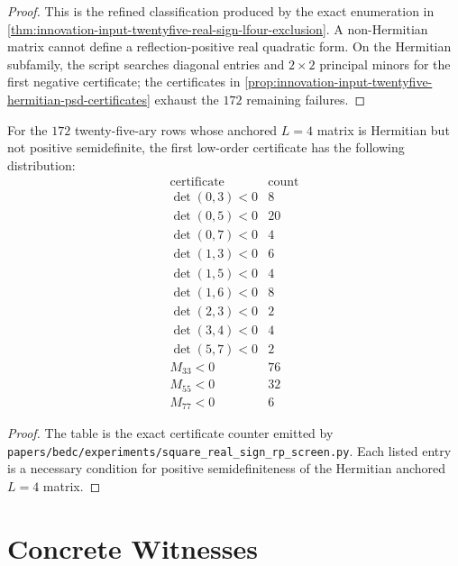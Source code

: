 \begin{proof}
This is the refined classification produced by the exact enumeration in
\autoref{thm:innovation-input-twentyfive-real-sign-lfour-exclusion}. A
non-Hermitian matrix cannot define a reflection-positive real quadratic
form. On the Hermitian subfamily, the script searches diagonal entries and
$2\times2$ principal minors for the first negative certificate; the
certificates in
\autoref{prop:innovation-input-twentyfive-hermitian-psd-certificates}
exhaust the $172$ remaining failures.
\end{proof}

\begin{proposition}
\label{prop:innovation-input-twentyfive-hermitian-psd-certificates}
For the $172$ twenty-five-ary rows whose anchored $L=4$ matrix is
Hermitian but not positive semidefinite, the first low-order certificate
has the following distribution:
$$
\begin{array}{c|r}
\text{certificate} & \text{count}\\
\hline
\det(0,3)<0 & 8\\
\det(0,5)<0 & 20\\
\det(0,7)<0 & 4\\
\det(1,3)<0 & 6\\
\det(1,5)<0 & 4\\
\det(1,6)<0 & 8\\
\det(2,3)<0 & 2\\
\det(3,4)<0 & 4\\
\det(5,7)<0 & 2\\
M_{33}<0 & 76\\
M_{55}<0 & 32\\
M_{77}<0 & 6
\end{array}
$$
\end{proposition}

\begin{proof}
The table is the exact certificate counter emitted by
\texttt{papers/bedc/experiments/square\_real\_sign\_rp\_screen.py}. Each
listed entry is a necessary condition for positive semidefiniteness of the
Hermitian anchored $L=4$ matrix.
\end{proof}

\section{Concrete Witnesses}
\label{sec:innovation-input-twentyfive-concrete-witnesses}

